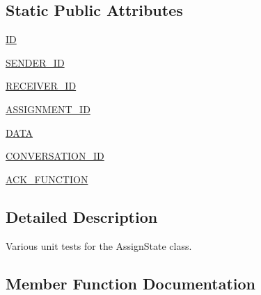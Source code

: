 \subsection*{Static Public Attributes}
\begin{DoxyCompactItemize}
\item 
\hyperlink{classparlai_1_1mturk_1_1core_1_1dev_1_1test_1_1test__socket__manager_1_1TestPacket_af96bca01d705227fd9c1e1f9317cd3cb}{ID}
\item 
\hyperlink{classparlai_1_1mturk_1_1core_1_1dev_1_1test_1_1test__socket__manager_1_1TestPacket_ae7d65da11678c8b2a39eb26fff060ab7}{S\+E\+N\+D\+E\+R\+\_\+\+ID}
\item 
\hyperlink{classparlai_1_1mturk_1_1core_1_1dev_1_1test_1_1test__socket__manager_1_1TestPacket_a136e70a062e97dda74034e1edb1862fa}{R\+E\+C\+E\+I\+V\+E\+R\+\_\+\+ID}
\item 
\hyperlink{classparlai_1_1mturk_1_1core_1_1dev_1_1test_1_1test__socket__manager_1_1TestPacket_a9c54ffa0efdafb2a585b537ebc2911fb}{A\+S\+S\+I\+G\+N\+M\+E\+N\+T\+\_\+\+ID}
\item 
\hyperlink{classparlai_1_1mturk_1_1core_1_1dev_1_1test_1_1test__socket__manager_1_1TestPacket_ae83f5662b66fa41ae91893c03983caab}{D\+A\+TA}
\item 
\hyperlink{classparlai_1_1mturk_1_1core_1_1dev_1_1test_1_1test__socket__manager_1_1TestPacket_a0f58d13d47d4d07169517e6e756d9fba}{C\+O\+N\+V\+E\+R\+S\+A\+T\+I\+O\+N\+\_\+\+ID}
\item 
\hyperlink{classparlai_1_1mturk_1_1core_1_1dev_1_1test_1_1test__socket__manager_1_1TestPacket_a5b888cd6c3c978a1fdf623fd2e91ab66}{A\+C\+K\+\_\+\+F\+U\+N\+C\+T\+I\+ON}
\end{DoxyCompactItemize}


\subsection{Detailed Description}
\begin{DoxyVerb}Various unit tests for the AssignState class.
\end{DoxyVerb}
 

\subsection{Member Function Documentation}
\mbox{\label{classparlai_1_1mturk_1_1core_1_1dev_1_1test_1_1test__socket__manager_1_1TestPacket_a4196d80242bfccac6eb0348ab04da7ac}} 
